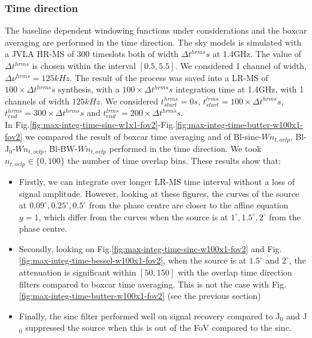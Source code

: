 \documentclass[useAMS,usenatbib]{mn2e}
\begin{document}
\subsubsection{Time direction}
The baseline dependent windowing functions under considerations and the boxcar averaging are performed in the time direction.
The sky models is simulated with a JVLA HR-MS of $300$ timeslots both of width $\Delta t^{hrms}s$ at 1.4GHz. The value of  
$\Delta t^{hrms}$ is chosen within the interval $[0.5,5.5]$. We considered 1 channel of width, $\Delta \nu^{hrms}=125kHz$. The result of the 
process was saved into a LR-MS of $100\times\Delta t^{hrms}s$ synthesis, with a $100\times\Delta t^{hrms}s$ integration time at 1.4GHz, with 
1 channels of width $125kHz$. We considered $t^{hrms}_{start}=0s$, $t^{lrms}_{start}=100\times\Delta t^{hrms} s$, 
$t^{hrms}_{end}=300\times\Delta t^{hrms}s$ and $t^{lrms}_{end}=200\times\Delta t^{hrms}s$.\\
In Fig.\ref{fig:max-integ-time-sinc-w1x1-fov2}-Fig.\ref{fig:max-integ-time-butter-w100x1-fov2} we compared the result of boxcar time
averaging and of  Bl-sinc-$W n_{t,ovlp}$, Bl-J$_0$-$W n_{t,ovlp}$, Bl-BW-$W n_{t,ovlp}$ performed in the time 
direction. We took $n_{t,ovlp}\in\{0,100\}$ the number of time overlap bins. These results show that:
\begin{itemize}
 \item Firstly,  we can integrate over longer LR-MS time interval without a loss of signal 
amplitude. However, looking at these figures, the curves of the source at $0.09^{\circ},0.25^{\circ},0.5^{\circ}$ from the phase centre are 
closer to the affine equation $y=1$, which differ from the curves when the source is at $1^{\circ},1.5^{\circ}, 2^{\circ}$ from the phase 
centre.  
 \item Secondly, looking on Fig.\ref{fig:max-integ-time-sinc-w100x1-fov2} and Fig.\ref{fig:max-integ-time-bessel-w100x1-fov2}, when the 
source is at $1.5^{\circ}$ and $2^{\circ}$, the attenuation is significant within 
$[50,150]$ with the overlap time direction filters compared to boxcar time averaging. This is not the case with 
Fig.\ref{fig:max-integ-time-butter-w100x1-fov2} (see the previous section)
 \item Finally, the sinc filter performed well on signal recovery compared to J$_0$ and J$_0$ suppressed 
the source when this is out of the FoV compared to the sinc.  
\end{itemize}
\end{document}

